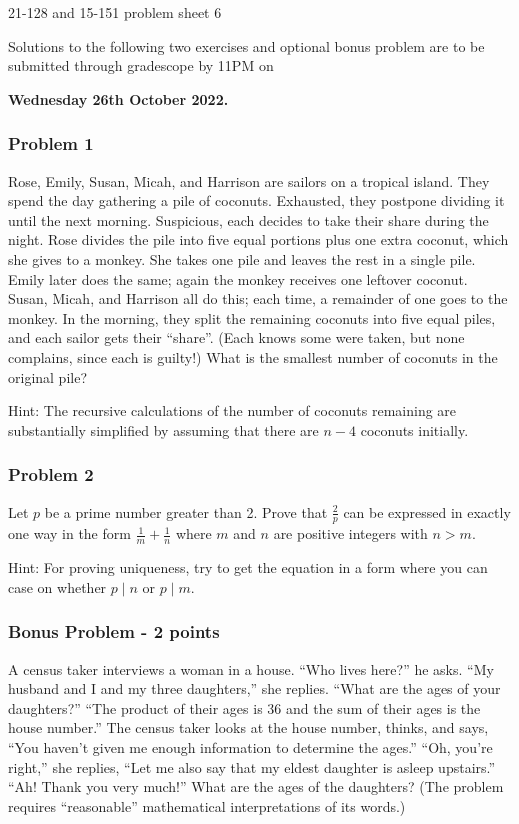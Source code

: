 \newpage\documentclass[11pt,onecolumn,fleqn]{article}
\theoremstyle{definition}
\begin{document}
\thispagestyle{empty}
\begin{center}
{\Huge 21-128 and 15-151 problem sheet 6}

Solutions to the following two exercises and optional bonus problem are to be submitted through 
gradescope by 11PM on

\textbf{Wednesday 26th October 2022.}

\end{center}

\subsubsection*{Problem 1}
Rose, Emily, Susan, Micah, and Harrison are sailors on a tropical island. They spend the day gathering a pile of coconuts. Exhausted, they postpone dividing it until the next morning. Suspicious, each decides to take their share during the night. Rose divides the pile into 
five equal portions plus one extra coconut, which she gives to a monkey. She takes one pile and leaves the rest in 
a single pile. Emily later does the same; again the monkey receives one leftover coconut. Susan, Micah, and Harrison all do this; each time, a remainder of one goes to the monkey. In the morning, they split 
the remaining coconuts into five equal piles, and each sailor gets their ``share''. (Each knows some were taken, but 
none complains, since each is guilty!) What is the smallest number of coconuts in the original pile?

\noindent
Hint: The recursive calculations of the number of coconuts remaining are substantially simplified by assuming that 
there are $n-4$ coconuts initially.

\subsubsection*{Problem 2}
Let $p$ be a prime number greater than 2. Prove that $\frac{2}{p}$
can be expressed in exactly one way in the form $\frac1m + \frac1n$ where $m$ and $n$ are positive
integers with $n > m$. 

\noindent
Hint: For proving uniqueness, try to get the equation in a form where you can case on whether $p \mid n$ or $p \mid m$.


\subsubsection*{Bonus Problem - 2 points}
A census taker interviews a woman in a house. ``Who lives here?'' he asks. ``My husband and I and my three daughters,'' she replies. ``What are the ages
of your daughters?'' ``The product of their ages is 36 and the sum of their ages is the house number.'' The census taker looks at the house number, thinks,
and says, ``You haven't given me enough information to determine the ages.'' ``Oh, you're right,'' she replies, ``Let me also say that my eldest daughter is asleep
upstairs.'' ``Ah! Thank you very much!'' What are the ages of the daughters? (The problem requires ``reasonable'' mathematical interpretations of its words.)
\end{document}
